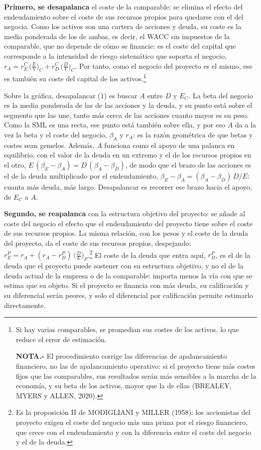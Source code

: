 \documentclass[10pt,a4paper]{article}
\begin{document}
\textbf{Primero, se desapalanca} el coste de la comparable: se elimina el efecto del endeudamiento sobre el coste de sus recursos propios para quedarse con el del negocio. Como los activos son una cartera de acciones y deuda, su coste es la media ponderada de los de ambas, es decir, el WACC sin impuestos de la comparable, que no depende de cómo se financie: es el coste del capital que corresponde a la intensidad de riesgo sistemático que soporta el negocio, $r_A=r_E^C\,\Big(\frac{E}{V}\Big)_C+r_D^C\,\Big(\frac{D}{V}\Big)_C$. Por tanto, como el negocio del proyecto es el mismo, ese es también su coste del capital de los activos.\footnote{%
    Si hay varias comparables, se promedian sus costes de los activos, lo que reduce el error de estimación.

    \textbf{NOTA.-} El procedimiento corrige las diferencias de apalancamiento financiero, no las de apalancamiento operativo: si el proyecto tiene más costes fijos que las comparables, sus resultados serán más sensibles a la marcha de la economía, y su beta de los activos, mayor que la de ellas (BREALEY, MYERS y ALLEN, 2020).
}

Sobre la gráfica, desapalancar (1) es buscar $A$ entre $D$ y $E_C$. La beta del negocio es la media ponderada de las de las acciones y la deuda, y su punto está sobre el segmento que las une, tanto más cerca de las acciones cuanto mayor es su peso. Como la SML es una recta, ese punto está también sobre ella, y por eso $A$ da a la vez la beta y el coste del negocio, $\beta_A$ y $r_A$: es la razón geométrica de que betas y costes sean gemelos. Además, $A$ funciona como el apoyo de una palanca en equilibrio, con el valor de la deuda en un extremo y el de los recursos propios en el otro, $E\,(\beta_E-\beta_A)=D\,(\beta_A-\beta_D)$, de modo que el brazo de las acciones es el de la deuda multiplicado por el endeudamiento, $\beta_E-\beta_A=(\beta_A-\beta_D)\,D/E$: cuanta más deuda, más largo. Desapalancar es recorrer ese brazo hacia el apoyo, de $E_C$ a $A$.

\textbf{Segundo, se reapalanca} con la estructura objetivo del proyecto: se añade al coste del negocio el efecto que el endeudamiento del proyecto tiene sobre el coste de sus recursos propios. La misma relación, con los pesos y el coste de la deuda del proyecto, da el coste de sus recursos propios, despejando: $r_E^P=r_A+(r_A-r_D^P)\,\Big(\frac{D}{E}\Big)_P$.\footnote{%
  Es la proposición II de MODIGLIANI y MILLER (1958): los accionistas del proyecto exigen el coste del negocio más una prima por el riesgo financiero, que crece con el endeudamiento y con la diferencia entre el coste del negocio y el de la deuda.
} El coste de la deuda que entra aquí, $r_D^P$, es el de la deuda que el proyecto puede sostener con su estructura objetivo, y no el de la deuda actual de la empresa o de la comparable: importa menos la vía con que se estima que su objeto. Si el proyecto se financia con más deuda, su calificación y su diferencial serán peores, y solo el diferencial por calificación permite estimarlo directamente.
\end{document}
